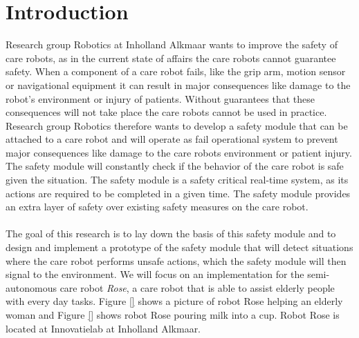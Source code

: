 \documentclass[12pt]{scrreprt}
\begin{document}
\chapter{Introduction}
\label{Introduction}
Research group Robotics at Inholland Alkmaar wants to improve the safety of care robots, as in the current state of affairs the care robots cannot guarantee safety. When a component of a care robot fails, like the grip arm, motion sensor or navigational equipment it can result in major consequences like damage to the robot's environment or injury of patients. Without guarantees that these consequences will not take place the care robots cannot be used in practice. Research group Robotics therefore wants to develop a safety module that can be attached to a care robot and will operate as fail operational system to prevent major consequences like damage to the care robots environment or patient injury. The safety module will constantly check if the behavior of the care robot is safe given the situation. The safety module is a safety critical real-time system, as its actions are required to be completed in a given time. The safety module provides an extra layer of safety over existing safety measures on the care robot.
\\\\
The goal of this research is to lay down the basis of this safety module and to design and implement a prototype of the safety module that will detect situations where the care robot performs unsafe actions, which the safety module will then signal to the environment. We will focus on an implementation for the semi-autonomous care robot \textit{Rose}, a care robot that is able to assist elderly people with every day tasks. Figure \ref{} shows a picture of robot Rose helping an elderly woman and Figure \ref{} shows robot Rose pouring milk into a cup. Robot Rose is located at Innovatielab at Inholland Alkmaar.
\\\\
\end{document}
